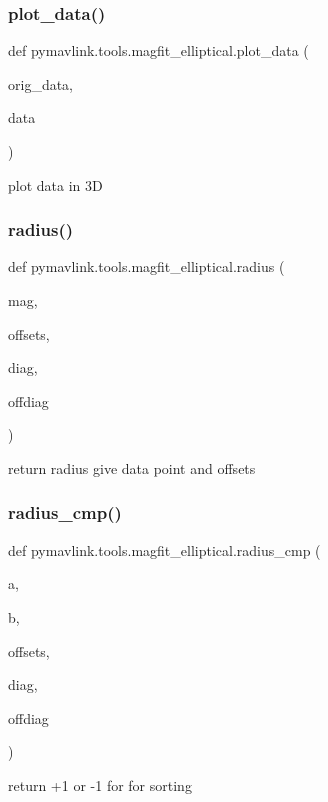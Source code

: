 \subsubsection{\texorpdfstring{plot\+\_\+data()}{plot\_data()}}
{\footnotesize\ttfamily def pymavlink.\+tools.\+magfit\+\_\+elliptical.\+plot\+\_\+data (\begin{DoxyParamCaption}\item[{}]{orig\+\_\+data,  }\item[{}]{data }\end{DoxyParamCaption})}

\begin{DoxyVerb}plot data in 3D\end{DoxyVerb}
 \mbox{\label{namespacepymavlink_1_1tools_1_1magfit__elliptical_ad64337f0e7fad08ebdde9d99930c0c4b}} 
\subsubsection{\texorpdfstring{radius()}{radius()}}
{\footnotesize\ttfamily def pymavlink.\+tools.\+magfit\+\_\+elliptical.\+radius (\begin{DoxyParamCaption}\item[{}]{mag,  }\item[{}]{offsets,  }\item[{}]{diag,  }\item[{}]{offdiag }\end{DoxyParamCaption})}

\begin{DoxyVerb}return radius give data point and offsets\end{DoxyVerb}
 \mbox{\label{namespacepymavlink_1_1tools_1_1magfit__elliptical_a103d997042a9a3703cb39c2a9ae8cbf2}} 
\subsubsection{\texorpdfstring{radius\+\_\+cmp()}{radius\_cmp()}}
{\footnotesize\ttfamily def pymavlink.\+tools.\+magfit\+\_\+elliptical.\+radius\+\_\+cmp (\begin{DoxyParamCaption}\item[{}]{a,  }\item[{}]{b,  }\item[{}]{offsets,  }\item[{}]{diag,  }\item[{}]{offdiag }\end{DoxyParamCaption})}

\begin{DoxyVerb}return +1 or -1 for for sorting\end{DoxyVerb}
 